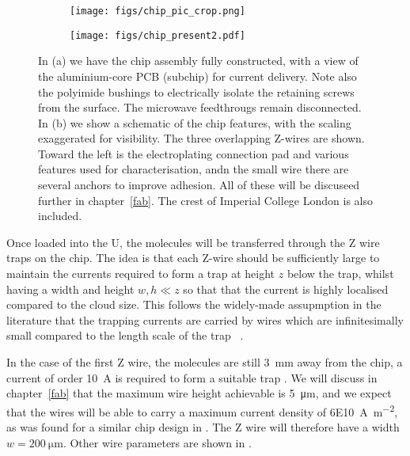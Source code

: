 \begin{figure}[ht]
  \centering
  \begin{subfigure}[b]{0.45\textwidth}
    \texttt{[image: figs/chip\_pic\_crop.png]}
    \caption{}
  \end{subfigure}
  \hspace{1cm}
  \begin{subfigure}[b]{0.45\textwidth}
    \centering
    \texttt{[image: figs/chip\_present2.pdf]}
    \caption{}
  \end{subfigure}
  \caption{
    In (a) we have the chip assembly fully constructed, with a view of the
    aluminium-core PCB (subchip) for current delivery. Note also the polyimide
    bushings to electrically isolate the retaining screws from the surface. The
    microwave feedthrougs remain disconnected. In (b) we show a schematic of
    the chip features, with the scaling exaggerated for visibility. The three
    overlapping Z-wires are shown. Toward the left is the electroplating
    connection pad and various features used for characterisation, andn the small
  wire there are several anchors to improve adhesion. All of these will be
  discuseed further in chapter~\ref{fab}. The crest of Imperial College London
is also included.}
  \label{design:fig:chipexperiment}
\end{figure}

Once loaded into the U, the molecules will be transferred through the Z wire
traps on the chip. The idea is that each Z-wire should be sufficiently large to
maintain the currents required to form a trap at height $z$ below the trap,
whilst having a width and height  $w, h \ll z$ so that that the current is
highly localised compared to the cloud size.  This follows the widely-made
assupmption in the literature that the trapping currents are carried by wires
which are infinitesimally small compared to the length scale of the trap
~\cite{}.

In the case of the first Z wire, the molecules are still \SI{3}{\milli\meter}
away from the chip, a current of order \SI{10}{\ampere} is required to form a
suitable trap
%
.
%
We will discuss in chapter~\ref{fab} that the maximum wire height achievable is
\SI{5}{\micro\meter}, and we expect that the wires will be able to carry a
maximum current density of \SI{6E10}{\ampere\per\meter\squared}, as was found
for a similar chip design in . The Z wire will
therefore have a width $w=\SI{200}{\micro\meter}$. Other wire parameters are
shown in .

